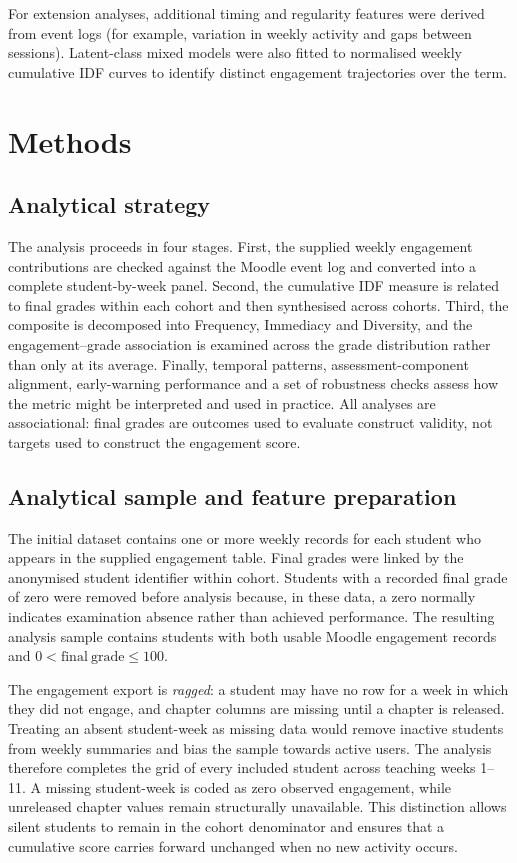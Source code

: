 \documentclass[11pt,a4paper]{article}
\begin{document}
For extension analyses, additional timing and regularity features were derived
from event logs (for example, variation in weekly activity and gaps between
sessions). Latent-class mixed models were also fitted to normalised weekly
cumulative IDF curves to identify distinct engagement trajectories over the term.

\section{Methods}

\subsection{Analytical strategy}
The analysis proceeds in four stages. First, the supplied weekly engagement
contributions are checked against the Moodle event log and converted into a
complete student-by-week panel. Second, the cumulative IDF measure is related to
final grades within each cohort and then synthesised across cohorts. Third, the
composite is decomposed into Frequency, Immediacy and Diversity, and the
engagement--grade association is examined across the grade distribution rather
than only at its average. Finally, temporal patterns, assessment-component
alignment, early-warning performance and a set of robustness checks assess how
the metric might be interpreted and used in practice. All analyses are
associational: final grades are outcomes used to evaluate construct validity, not
targets used to construct the engagement score.

\subsection{Analytical sample and feature preparation}
The initial dataset contains one or more weekly records for each student who
appears in the supplied engagement table. Final grades were linked by the
anonymised student identifier within cohort. Students with a recorded final grade
of zero were removed before analysis because, in these data, a zero normally
indicates examination absence rather than achieved performance. The resulting
analysis sample contains students with both usable Moodle engagement records and
$0 < \mathrm{final\ grade} \leq 100$.

The engagement export is \emph{ragged}: a student may have no row for a week in
which they did not engage, and chapter columns are missing until a chapter is
released. Treating an absent student-week as missing data would remove inactive
students from weekly summaries and bias the sample towards active users. The
analysis therefore completes the grid of every included student across teaching
weeks 1--11. A missing student-week is coded as zero observed engagement, while
unreleased chapter values remain structurally unavailable. This distinction
allows silent students to remain in the cohort denominator and ensures that a
cumulative score carries forward unchanged when no new activity occurs.
\end{document}
